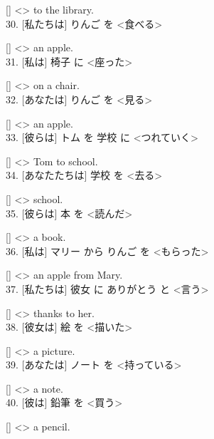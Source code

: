 \documentclass[uplatex,
paper=a4,
fontsize=18pt,
jafontsize=16pt,
number_of_lines=30,
line_length=30zh,
baselineskip=25pt,
]{jlreq}
\begin{document}
  [\hspace{3em}] <\hspace{3em}> to the library.
\\

30.  [私たちは] りんご を <食べる>

  [\hspace{3em}] <\hspace{3em}> an apple.
\\

31.  [私は] 椅子 に <座った>

  [\hspace{3em}] <\hspace{3em}> on a chair.
\\

32.  [あなたは] りんご を <見る>

  [\hspace{3em}] <\hspace{3em}> an apple.
\\

33.  [彼らは] トム を 学校 に <つれていく>

  [\hspace{3em}] <\hspace{3em}> Tom to school.
\\

34.  [あなたたちは] 学校 を <去る>

  [\hspace{3em}] <\hspace{3em}> school.
\\

35.  [彼らは] 本 を <読んだ>

  [\hspace{3em}] <\hspace{3em}> a book.
\\

36.  [私は] マリー から りんご を <もらった>

  [\hspace{3em}] <\hspace{3em}> an apple from Mary.
\\

37.  [私たちは] 彼女 に ありがとう と <言う>

  [\hspace{3em}] <\hspace{3em}> thanks to her.
\\

38.  [彼女は] 絵 を <描いた>

  [\hspace{3em}] <\hspace{3em}> a picture.
\\

39.  [あなたは] ノート を <持っている>

  [\hspace{3em}] <\hspace{3em}> a note.
\\

40.  [彼は] 鉛筆 を <買う>

  [\hspace{3em}] <\hspace{3em}> a pencil.
\\
\end{document}
